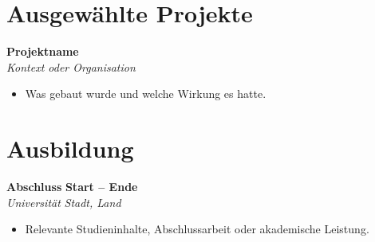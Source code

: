 \documentclass[a4paper,11pt]{article}
\begin{document}
\section{Ausgewählte Projekte}

\textbf{Projektname} \\
\textit{Kontext oder Organisation}
\begin{itemize}
   \item Was gebaut wurde und welche Wirkung es hatte.
\end{itemize}

\section{Ausbildung}

\textbf{Abschluss} \hfill \textbf{Start -- Ende} \\
\textit{Universität} \hfill \textit{Stadt, Land}
\begin{itemize}
   \item Relevante Studieninhalte, Abschlussarbeit oder akademische Leistung.
\end{itemize}
\end{document}
